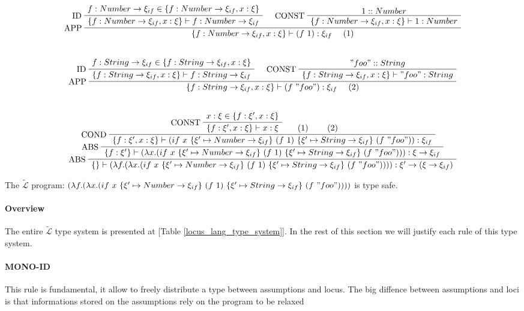 \documentclass[a4paper]{report}
\newcommand{\lang}[0]{\mathcal{L}}
\newcommand{\locus}[1]{\widetilde{#1}}
\newcommand{\reftab}[1]{[Table \ref{#1}]}
\newcommand{\ax}[1]%
{\AxiomC{$#1$}}
\newcommand{\unc}[1]%
{\UnaryInfC{$#1$}}
\newcommand{\bic}[1]%
{\BinaryInfC{$#1$}}
\newcommand{\tric}[1]%
{\TrinaryInfC{$#1$}}
\newcommand{\drule}%
{\DisplayProof}
\begin{document}
\begin{table}
\centering
$$\begin{array}{c}
\ax{f:Number\to\xi_{if}\in\{f:Number\to\xi_{if},x:\xi\}}
\LeftLabel{ID}
\unc{\{f:Number\to\xi_{if},x:\xi\}\vdash f:Number\to\xi_{if}}
\ax{1::Number}
\LeftLabel{CONST}
\unc{\{f:Number\to\xi_{if},x:\xi\}\vdash 1:Number}
\LeftLabel{APP}
\bic{\{f:Number\to\xi_{if},x:\xi\}\vdash (f\ 1):\xi_{if}\ \ \ \ (1)}
\drule
\\\\\\
\ax{f:String\to\xi_{if}\in\{f:String\to\xi_{if},x:\xi\}}
\LeftLabel{ID}
\unc{\{f:String\to\xi_{if},x:\xi\}\vdash f:String\to\xi_{if}}
\ax{"foo"::String}
\LeftLabel{CONST}
\unc{\{f:String\to\xi_{if},x:\xi\}\vdash "foo":String}
\LeftLabel{APP}
\bic{\{f:String\to\xi_{if},x:\xi\}\vdash (f\ "foo"):\xi_{if}\ \ \ \ (2)}
\drule
\\\\\\
\ax{x:\xi\in\{f:\xi',x:\xi\}}
\LeftLabel{CONST}
\unc{\{f:\xi',x:\xi\}\vdash x:\xi}
\ax{(1)}
\ax{(2)}
\LeftLabel{COND}
\tric{\{f:\xi',x:\xi\}\vdash(if\ x\ \{\xi'\mapsto Number\to\xi_{if}\}\ (f\ 1)\ \{\xi'\mapsto String\to\xi_{if}\}\ (f\ "foo")):\xi_{if}}
\LeftLabel{ABS}
\unc{\{f:\xi'\}\vdash(\lambda x.(if\ x\ \{\xi'\mapsto Number\to\xi_{if}\}\ (f\ 1)\ \{\xi'\mapsto String\to\xi_{if}\}\ (f\ "foo"))):\xi\to\xi_{if}}
\LeftLabel{ABS}
\unc{\{\}\vdash(\lambda f.(\lambda x.(if\ x\ \{\xi'\mapsto Number\to\xi_{if}\}\ (f\ 1)\ \{\xi'\mapsto String\to\xi_{if}\}\ (f\ "foo")))):\xi'\to(\xi\to\xi_{if})}
\drule
\\
\end{array}$$
\caption{The $\locus\lang$ program: $(\lambda f.(\lambda x.(if\ x\ \{\xi'\mapsto Number\to\xi_{if}\}\ (f\ 1)\ \{\xi'\mapsto String\to\xi_{if}\}\ (f\ "foo"))))$ is type safe.}
\label{deriv_cond}
\end{table}

\paragraph{Overview} The entire $\locus\lang$ type system is presented at \reftab{locus_lang_type_system}. In the rest of this section we will justify each rule of this type system.

\paragraph{MONO-ID} This rule is fundamental, it allow to freely distribute a type between assumptions and locus. The big diffence between assumptions and loci is that informations stored on the assumptions rely on the program to be relaxed
\end{document}
